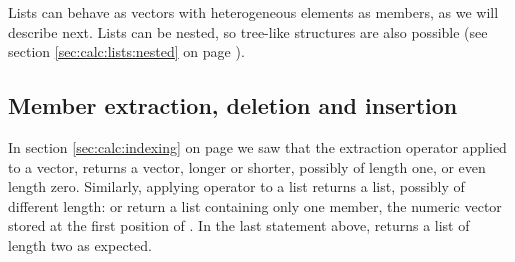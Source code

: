 \documentclass[krantz2]{krantz}\usepackage{knitr}
\begin{document}
Lists can behave as vectors with heterogeneous elements as members, as we will describe next. Lists can be nested, so tree-like structures are also possible (see section \ref{sec:calc:lists:nested} on page \pageref{sec:calc:lists:nested}).


\subsection{Member extraction, deletion and insertion}

In section \ref{sec:calc:indexing} on page \pageref{sec:calc:indexing} we saw that the extraction operator \Roperator{[]} applied to a vector, returns a vector, longer or shorter, possibly of length one, or even length zero. Similarly, applying operator \Roperator{[]} to a list returns a list, possibly of different length:  or  return a list containing only one member, the numeric vector stored at the first position of . In the last statement above,  returns a list of length two as expected.
\end{document}
